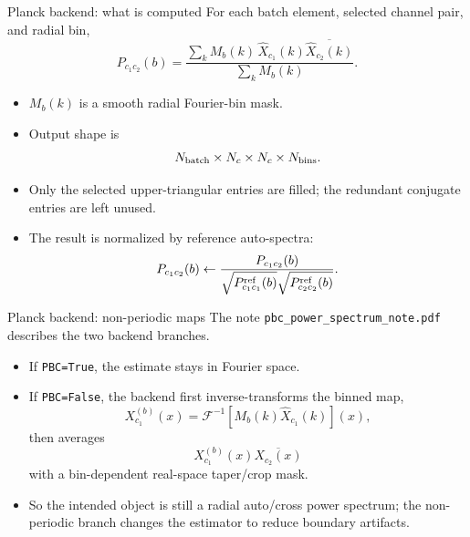 \documentclass[10pt]{beamer}
\begin{document}
\begin{frame}{Planck backend: what is computed}
  For each batch element, selected channel pair, and radial bin,
  \[
    P_{c_1c_2}(b)
    =
    \frac{
      \sum_k M_b(k)\,\widehat X_{c_1}(k)
      \overline{\widehat X_{c_2}(k)}
    }{
      \sum_k M_b(k)
    }.
  \]

  \begin{itemize}
    \item \(M_b(k)\) is a smooth radial Fourier-bin mask.
    \item Output shape is
    \[
      N_{\rm batch}\times N_c\times N_c\times N_{\rm bins}.
    \]
    \item Only the selected upper-triangular entries are filled; the redundant
    conjugate entries are left unused.
    \item The result is normalized by reference auto-spectra:
    \[
      P_{c_1c_2}(b) \leftarrow
      \frac{P_{c_1c_2}(b)}
      {\sqrt{P^{\rm ref}_{c_1c_1}(b)}\sqrt{P^{\rm ref}_{c_2c_2}(b)}}.
    \]
  \end{itemize}
\end{frame}

\begin{frame}{Planck backend: non-periodic maps}
  The note \texttt{pbc\_power\_spectrum\_note.pdf} describes the two backend
  branches.

  \begin{itemize}
    \item If \texttt{PBC=True}, the estimate stays in Fourier space.

    \item If \texttt{PBC=False}, the backend first inverse-transforms the
    binned map,
    \[
      X^{(b)}_{c_1}(x)
      =
      \mathcal{F}^{-1}\!\left[M_b(k)\widehat X_{c_1}(k)\right](x),
    \]
    then averages
    \[
      X^{(b)}_{c_1}(x)\overline{X_{c_2}(x)}
    \]
    with a bin-dependent real-space taper/crop mask.

    \item So the intended object is still a radial auto/cross power spectrum;
    the non-periodic branch changes the estimator to reduce boundary artifacts.
  \end{itemize}
\end{frame}
\end{document}
